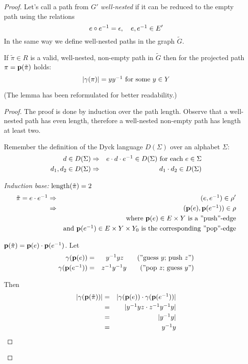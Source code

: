 \begin{proof}
Let's call a path from $G'$ {\em well-nested} if it can be
reduced to the empty path using the relations
\[ e\circ \mbox{${e}^{-1}$} = \epsilon,\quad e, \mbox{${e}^{-1}$} \in E' \]
In the same way we define well-nested paths in the graph $\tilde{G}$.

\begin{lemma}
If $\tilde{\pi} \in R$ is a valid, well-nested, non-empty path in
$\tilde{G}$ then for the projected path $\pi = \mathbf{p}({\tilde{\pi}})$ holds:
\[ |\gamma(\pi)| = y \mbox{${y}^{-1}$}\text{ for some }y \in Y \]
\end{lemma}

(The lemma has been reformulated for better readability.)
\begin{proof}
The proof is done by induction over the path length. Observe that a well-nested
path has even length, therefore a well-nested non-empty path has length at least
two.

Remember the definition of the Dyck language $D(\Sigma)$ over an alphabet
$\Sigma$:
\begin{eqnarray*}
d \in D(\Sigma) &\Rightarrow& e \cdot d \cdot \mbox{${e}^{-1}$} \in D(\Sigma)\text{ for
each }e \in \Sigma \\
d_1, d_2 \in D(\Sigma) &\Rightarrow& d_1 \cdot d_2 \in D(\Sigma)
\end{eqnarray*}

{\em Induction base:} $\mathrm{length}({\tilde{\pi}})=2$
\begin{eqnarray*}
\tilde{\pi} = e \cdot \mbox{${e}^{-1}$} &\Rightarrow& (e, \mbox{${e}^{-1}$}) \in \rho' \\
&\Rightarrow& (\mathbf{p}({e}), \mathbf{p}({\mbox{${e}^{-1}$}})) \in \rho \\
&& \text{where }\mathbf{p}({e}) \in E \times Y\text{ is a ''push''-edge} \\
&& \text{and }\mathbf{p}({\mbox{${e}^{-1}$}}) \in E \times Y \times Y_0\text{ is the
corresponding ''pop''-edge}
\end{eqnarray*}

$\mathbf{p}({\tilde{\pi}}) = \mathbf{p}({e}) \cdot \mathbf{p}({\mbox{${e}^{-1}$}})$. Let
\begin{eqnarray*}
\gamma(\mathbf{p}({e})) &=& \mbox{${y}^{-1}$} y z \qquad\text{(''guess $y$;\ push $z$'')} \\
\gamma(\mathbf{p}({\mbox{${e}^{-1}$}})) &=& \mbox{${z}^{-1}$} \mbox{${y}^{-1}$} y \qquad\text{(''pop $z$;\ guess
$y$'')}
\end{eqnarray*}

Then
\begin{eqnarray*}
|\gamma(\mathbf{p}({\tilde{\pi}}))| &=& |\gamma(\mathbf{p}({e})) \cdot \gamma(\mathbf{p}({\mbox{${e}^{-1}$}}))|
\\
&=& |\mbox{${y}^{-1}$} y z \cdot \mbox{${z}^{-1}$} \mbox{${y}^{-1}$} y| \\
&=& |\mbox{${y}^{-1}$} y| \\
&=& \mbox{${y}^{-1}$} y
\end{eqnarray*}


\end{proof}
\end{proof}

